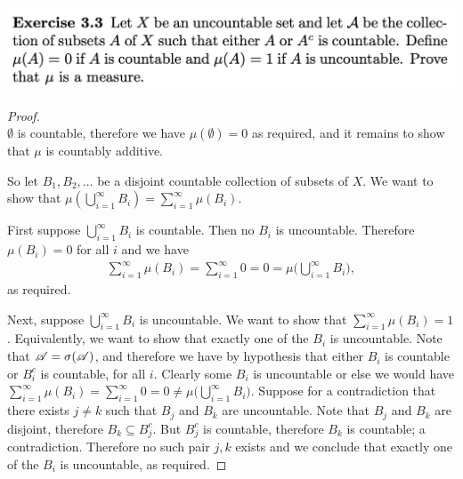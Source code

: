 \newpage
\begin{mdframed}
\includegraphics[width=400pt]{img/analysis--berkeley-202a-hw04-b168.png}
\end{mdframed}
\begin{proof}~\\
  $\emptyset$ is countable, therefore we have $\mu(\emptyset) = 0$ as required, and it remains to show
  that $\mu$ is countably additive.

  So let $B_1, B_2, \dots$ be a disjoint countable collection of subsets of $X$. We want to show
  that $\mu(\bigcup_{i=1}^\infty B_i) = \sum_{i=1}^\infty \mu(B_i)$.


  First suppose $\bigcup_{i=1}^\infty B_i$ is countable. Then no $B_i$ is uncountable. Therefore $\mu(B_i) = 0$
  for all $i$ and we have
  \begin{align*}
    \sum_{i=1}^\infty \mu(B_i) = \sum_{i=1}^\infty 0 = 0 = \mu\big(\bigcup_{i=1}^\infty B_i\big),
  \end{align*}
  as required.

  Next, suppose $\bigcup_{i=1}^\infty B_i$ is uncountable. We want to show
  that $\sum_{i=1}^\infty \mu(B_i) = 1$. Equivalently, we want to show that exactly one of the $B_i$ is
  uncountable. Note that $\mathscr A = \sigma(\mathscr A)$, and therefore we have by hypothesis that either $B_i$ is
  countable or $B_i^c$ is countable, for all $i$. Clearly some $B_i$ is uncountable or else we would
  have $\sum_{i=1}^\infty \mu(B_i) = \sum_{i=1}^\infty 0 = 0 \neq \mu\big(\bigcup_{i=1}^\infty B_i\big)$.
  Suppose for a contradiction that there exists $j \neq k$ such that $B_j$ and $B_k$ are uncountable. Note
  that $B_j$ and $B_k$ are disjoint, therefore $B_k \subseteq B_j^c$. But $B_j^c$ is countable, therefore $B_k$
  is countable; a contradiction. Therefore no such pair $j, k$ exists and we conclude that exactly one of
  the $B_i$ is uncountable, as required.
\end{proof}

